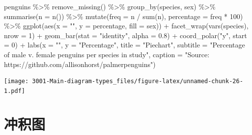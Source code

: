 \documentclass[
]{book}
\newenvironment{Shaded}{\begin{snugshade}}{\end{snugshade}}
\newcommand{\AttributeTok}[1]{\textcolor[rgb]{0.77,0.63,0.00}{#1}}
\newcommand{\DecValTok}[1]{\textcolor[rgb]{0.00,0.00,0.81}{#1}}
\newcommand{\FloatTok}[1]{\textcolor[rgb]{0.00,0.00,0.81}{#1}}
\newcommand{\FunctionTok}[1]{\textcolor[rgb]{0.00,0.00,0.00}{#1}}
\newcommand{\NormalTok}[1]{#1}
\newcommand{\SpecialCharTok}[1]{\textcolor[rgb]{0.00,0.00,0.00}{#1}}
\newcommand{\StringTok}[1]{\textcolor[rgb]{0.31,0.60,0.02}{#1}}
\begin{document}
\begin{Shaded}
\begin{Highlighting}[]
\NormalTok{penguins }\SpecialCharTok{\%\textgreater{}\%}
    \FunctionTok{remove\_missing}\NormalTok{() }\SpecialCharTok{\%\textgreater{}\%}
    \FunctionTok{group\_by}\NormalTok{(species, sex) }\SpecialCharTok{\%\textgreater{}\%}
    \FunctionTok{summarise}\NormalTok{(}\AttributeTok{n =} \FunctionTok{n}\NormalTok{()) }\SpecialCharTok{\%\textgreater{}\%}
    \FunctionTok{mutate}\NormalTok{(}\AttributeTok{freq =}\NormalTok{ n }\SpecialCharTok{/} \FunctionTok{sum}\NormalTok{(n),}
           \AttributeTok{percentage =}\NormalTok{ freq }\SpecialCharTok{*} \DecValTok{100}\NormalTok{) }\SpecialCharTok{\%\textgreater{}\%}
    \FunctionTok{ggplot}\NormalTok{(}\FunctionTok{aes}\NormalTok{(}\AttributeTok{x =} \StringTok{""}\NormalTok{, }\AttributeTok{y =}\NormalTok{ percentage,}
               \AttributeTok{fill =}\NormalTok{ sex)) }\SpecialCharTok{+}
    \FunctionTok{facet\_wrap}\NormalTok{(}\FunctionTok{vars}\NormalTok{(species), }\AttributeTok{nrow =} \DecValTok{1}\NormalTok{) }\SpecialCharTok{+}
    \FunctionTok{geom\_bar}\NormalTok{(}\AttributeTok{stat =} \StringTok{"identity"}\NormalTok{, }\AttributeTok{alpha =} \FloatTok{0.8}\NormalTok{) }\SpecialCharTok{+}
    \FunctionTok{coord\_polar}\NormalTok{(}\StringTok{"y"}\NormalTok{, }\AttributeTok{start =} \DecValTok{0}\NormalTok{) }\SpecialCharTok{+}
      \FunctionTok{labs}\NormalTok{(}\AttributeTok{x =} \StringTok{""}\NormalTok{, }
           \AttributeTok{y =} \StringTok{"Percentage"}\NormalTok{,}
          \AttributeTok{title =} \StringTok{"Piechart"}\NormalTok{, }
          \AttributeTok{subtitle =} \StringTok{"Percentage of male v. female penguins per species in study"}\NormalTok{,}
          \AttributeTok{caption =} \StringTok{"Source: https://github.com/allisonhorst/palmerpenguins"}\NormalTok{)}
\end{Highlighting}
\end{Shaded}

\texttt{[image: 3001-Main-diagram-types\_files/figure-latex/unnamed-chunk-26-1.pdf]}

\hypertarget{ux51b2ux79efux56fe}{%
\section{冲积图}\label{ux51b2ux79efux56fe}}
\end{document}
